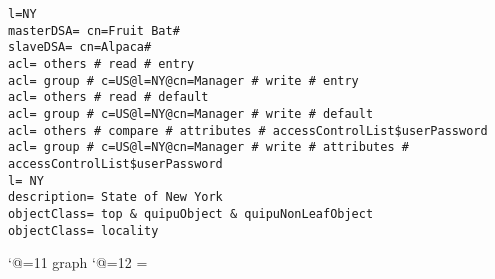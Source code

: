 
\scriptsize
\begin{verbatim}
l=NY
masterDSA= cn=Fruit Bat#
slaveDSA= cn=Alpaca#
acl= others # read # entry
acl= group # c=US@l=NY@cn=Manager # write # entry
acl= others # read # default
acl= group # c=US@l=NY@cn=Manager # write # default
acl= others # compare # attributes # accessControlList$userPassword
acl= group # c=US@l=NY@cn=Manager # write # attributes # accessControlList$userPassword
l= NY
description= State of New York
objectClass= top & quipuObject & quipuNonLeafObject
objectClass= locality

\end{verbatim}

\catcode`@=11
\expandafter\ifx\csname graph\endcsname\relax {}\box\chardef\insc@unt\graph\fi
\catcode`@=12
\setbox\graph=\empty
